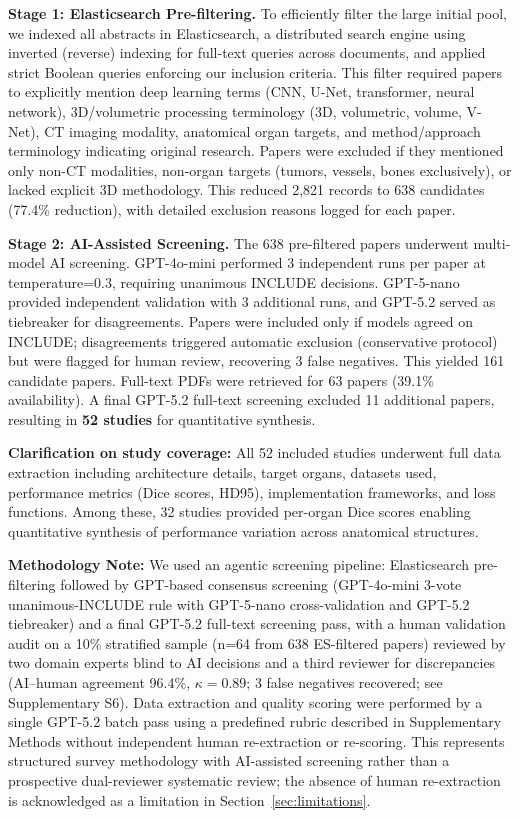 \documentclass[conference]{IEEEtran}
\begin{document}
\textbf{Stage 1: Elasticsearch Pre-filtering.} To efficiently filter the large initial pool, we indexed all abstracts in Elasticsearch, a distributed search engine using inverted (reverse) indexing for full-text queries across documents, and applied strict Boolean queries enforcing our inclusion criteria. This filter required papers to explicitly mention deep learning terms (CNN, U-Net, transformer, neural network), 3D/volumetric processing terminology (3D, volumetric, volume, V-Net), CT imaging modality, anatomical organ targets, and method/approach terminology indicating original research. Papers were excluded if they mentioned only non-CT modalities, non-organ targets (tumors, vessels, bones exclusively), or lacked explicit 3D methodology. This reduced 2,821 records to 638 candidates (77.4\% reduction), with detailed exclusion reasons logged for each paper.

\textbf{Stage 2: AI-Assisted Screening.} The 638 pre-filtered papers underwent multi-model AI screening. GPT-4o-mini performed 3 independent runs per paper at temperature=0.3, requiring unanimous INCLUDE decisions. GPT-5-nano provided independent validation with 3 additional runs, and GPT-5.2 served as tiebreaker for disagreements. Papers were included only if models agreed on INCLUDE; disagreements triggered automatic exclusion (conservative protocol) but were flagged for human review, recovering 3 false negatives. This yielded 161 candidate papers. Full-text PDFs were retrieved for 63 papers (39.1\% availability). A final GPT-5.2 full-text screening excluded 11 additional papers, resulting in \textbf{52 studies} for quantitative synthesis.

\textbf{Clarification on study coverage:} All 52 included studies underwent full data extraction including architecture details, target organs, datasets used, performance metrics (Dice scores, HD95), implementation frameworks, and loss functions. Among these, 32 studies provided per-organ Dice scores enabling quantitative synthesis of performance variation across anatomical structures.

\textbf{Methodology Note:} We used an agentic screening pipeline: Elasticsearch pre-filtering followed by GPT-based consensus screening (GPT-4o-mini 3-vote unanimous-INCLUDE rule with GPT-5-nano cross-validation and GPT-5.2 tiebreaker) and a final GPT-5.2 full-text screening pass, with a human validation audit on a 10\% stratified sample (n=64 from 638 ES-filtered papers) reviewed by two domain experts blind to AI decisions and a third reviewer for discrepancies (AI--human agreement 96.4\%, $\kappa = 0.89$; 3 false negatives recovered; see Supplementary S6). Data extraction and quality scoring were performed by a single GPT-5.2 batch pass using a predefined rubric described in Supplementary Methods without independent human re-extraction or re-scoring. This represents structured survey methodology with AI-assisted screening rather than a prospective dual-reviewer systematic review; the absence of human re-extraction is acknowledged as a limitation in Section~\ref{sec:limitations}.
\end{document}
